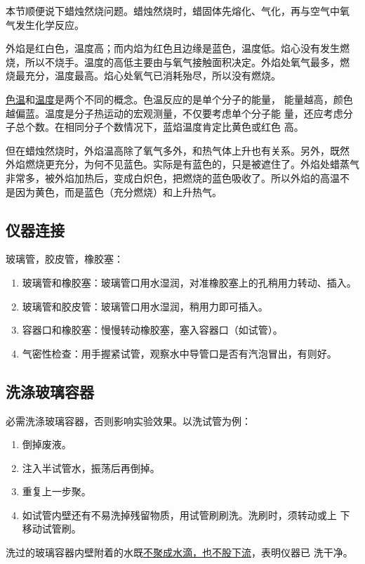 本节顺便说下蜡烛然烧问题。蜡烛然烧时，蜡固体先熔化、气化，再与空气中氧
气发生化学反应。

外焰是红白色，温度高；而内焰为红色且边缘是蓝色，温度低。焰心没有发生燃
烧，所以不烧手。温度的高低主要由与氧气接触面积决定。外焰处氧气最多，燃
烧最充分，温度最高。焰心处氧气已消耗殆尽，所以没有燃烧。

\uline{色温}和\uline{温度}是两个不同的概念。色温反应的是单个分子的能量，
能量越高，颜色越偏蓝。温度是分子热运动的宏观测量，不仅要考虑单个分子能
量，还应考虑分子总个数。在相同分子个数情况下，蓝焰温度肯定比黄色或红色
高。

但在蜡烛然烧时，外焰温高除了氧气多外，和热气体上升也有关系。另外，既然
外焰燃烧更充分，为何不见蓝色。实际是有蓝色的，只是被遮住了。外焰处蜡蒸气
非常多，被外焰加热后，变成白炽色，把燃烧的蓝色吸收了。所以外焰的高温不
是因为黄色，而是蓝色（充分燃烧）和上升热气。

\subsection{仪器连接}

玻璃管，胶皮管，橡胶塞：

\begin{enumerate}
\item 玻璃管和橡胶塞：玻璃管口用水湿润，对准橡胶塞上的孔稍用力转动、插入。
\item 玻璃管和胶皮管：玻璃管口用水湿润，稍用力即可插入。
\item 容器口和橡胶塞：慢慢转动橡胶塞，塞入容器口（如试管）。
\item 气密性检查：用手握紧试管，观察水中导管口是否有汽泡冒出，有则好。
\end{enumerate}

\subsection{洗涤玻璃容器}

必需洗涤玻璃容器，否则影响实验效果。以洗试管为例：

\begin{enumerate}
\item 倒掉废液。
\item 注入半试管水，振荡后再倒掉。
\item 重复上一步聚。
\item 如试管内壁还有不易洗掉残留物质，用试管刷刷洗。洗刷时，须转动或上
  下移动试管刷。
\end{enumerate}

洗过的玻璃容器内壁附着的水既\uline{不聚成水滴，也不股下流}，表明仪器已
洗干净。

